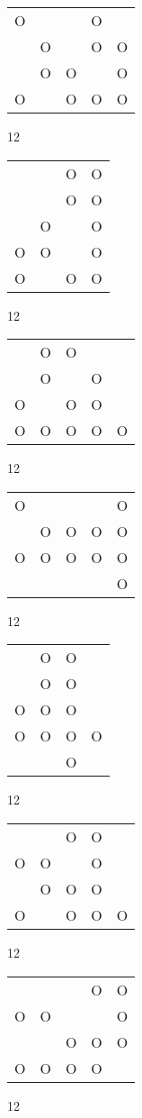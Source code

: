 \begin{tabular}{|m{0.2cm}m{0.2cm}m{0.2cm}m{0.2cm}m{0.2cm}|}\hline
O& & &O& \\
 &O& &O&O\\
 &O&O& &O\\
O& &O&O&O\\
\hline\end{tabular}12
\begin{tabular}{|m{0.2cm}m{0.2cm}m{0.2cm}m{0.2cm}|}\hline
 & &O&O\\
 & &O&O\\
 &O& &O\\
O&O& &O\\
O& &O&O\\
\hline\end{tabular}12
\begin{tabular}{|m{0.2cm}m{0.2cm}m{0.2cm}m{0.2cm}m{0.2cm}|}\hline
 &O&O& & \\
 &O& &O& \\
O& &O&O& \\
O&O&O&O&O\\
\hline\end{tabular}12
\begin{tabular}{|m{0.2cm}m{0.2cm}m{0.2cm}m{0.2cm}m{0.2cm}|}\hline
O& & & &O\\
 &O&O&O&O\\
O&O&O&O&O\\
 & & & &O\\
\hline\end{tabular}12
\begin{tabular}{|m{0.2cm}m{0.2cm}m{0.2cm}m{0.2cm}|}\hline
 &O&O& \\
 &O&O& \\
O&O&O& \\
O&O&O&O\\
 & &O& \\
\hline\end{tabular}12
\begin{tabular}{|m{0.2cm}m{0.2cm}m{0.2cm}m{0.2cm}m{0.2cm}|}\hline
 & &O&O& \\
O&O& &O& \\
 &O&O&O& \\
O& &O&O&O\\
\hline\end{tabular}12
\begin{tabular}{|m{0.2cm}m{0.2cm}m{0.2cm}m{0.2cm}m{0.2cm}|}\hline
 & & &O&O\\
O&O& & &O\\
 & &O&O&O\\
O&O&O&O& \\
\hline\end{tabular}12

